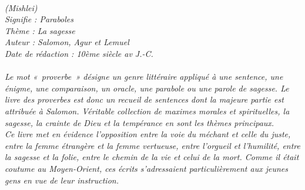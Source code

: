 \BFont
\noindent\hrulefill
{\footnotesize
\textit{
\bigskip
{\centering{}
\\(Mishlei)
\\Signifie : Paraboles
\\Thème : La sagesse
\\Auteur : Salomon, Agur et Lemuel
\\Date de rédaction : 10ème siècle av J.-C.\\}
}
\textit{
\\Le  mot  «~proverbe~» désigne un genre littéraire appliqué à une sentence, une énigme, une comparaison, un oracle, une parabole ou une parole de sagesse. Le livre des proverbes est donc un recueil de sentences dont la majeure partie est attribuée à Salomon. Véritable collection de maximes morales et spirituelles, la sagesse, la crainte de Dieu et la tempérance en sont les thèmes principaux. 
\\Ce livre met en évidence l’opposition entre la voie du méchant et celle du juste, entre la femme étrangère et la femme vertueuse,  entre l’orgueil et l’humilité, entre la sagesse et la folie, entre le chemin de la vie et celui de la mort.  Comme il était coutume au Moyen-Orient, ces écrits s’adressaient particulièrement aux jeunes gens en vue de leur instruction.\bigskip
}
}
\par\nobreak\noindent\hrulefill
